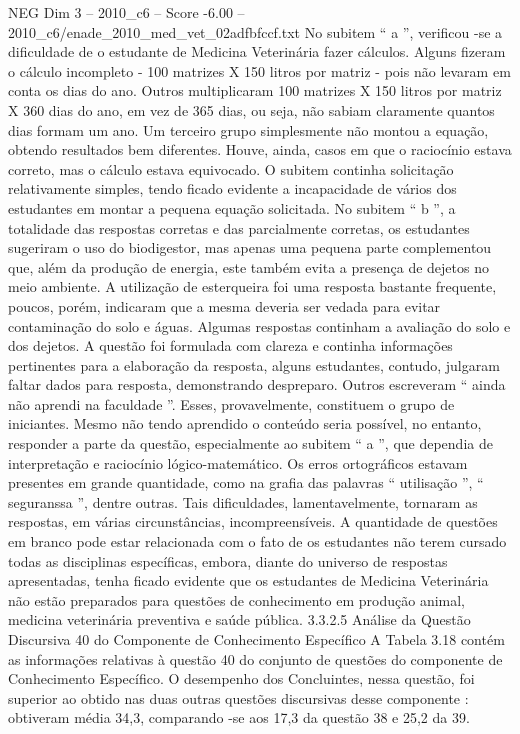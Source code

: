 \begin{textsample}{NEG Dim 3 – 2010\_c6 – Score -6.00 – 2010\_c6/enade\_2010\_med\_vet\_02adfbfccf.txt}
No subitem “ a ”, verificou -se a dificuldade de o estudante de Medicina Veterinária fazer cálculos.
Alguns fizeram o cálculo incompleto - 100 matrizes X 150 litros por matriz - pois não levaram em conta os dias do ano.
Outros multiplicaram 100 matrizes X 150 litros por matriz X 360 dias do ano, em vez de 365 dias, ou seja, não sabiam claramente quantos dias formam um ano.
Um terceiro grupo simplesmente não montou a equação, obtendo resultados bem diferentes.
Houve, ainda, casos em que o raciocínio estava correto, mas o cálculo estava equivocado.
O subitem continha solicitação relativamente simples, tendo ficado evidente a incapacidade de vários dos estudantes em montar a pequena equação solicitada.
No subitem “ b ”, a totalidade das respostas corretas e das parcialmente corretas, os estudantes sugeriram o uso do biodigestor, mas apenas uma pequena parte complementou que, além da produção de energia, este também evita a presença de dejetos no meio ambiente.
A utilização de esterqueira foi uma resposta bastante frequente, poucos, porém, indicaram que a mesma deveria ser vedada para evitar contaminação do solo e águas.
Algumas respostas continham a avaliação do solo e dos dejetos.
A questão foi formulada com clareza e continha informações pertinentes para a elaboração da resposta, alguns estudantes, contudo, julgaram faltar dados para resposta, demonstrando despreparo.
Outros escreveram “ ainda não aprendi na faculdade ”.
Esses, provavelmente, constituem o grupo de iniciantes.
Mesmo não tendo aprendido o conteúdo seria possível, no entanto, responder a parte da questão, especialmente ao subitem “ a ”, que dependia de interpretação e raciocínio lógico-matemático.
Os erros ortográficos estavam presentes em grande quantidade, como na grafia das palavras “ utilisação ”, “ seguranssa ”, dentre outras.
Tais dificuldades, lamentavelmente, tornaram as respostas, em várias circunstâncias, incompreensíveis.
A quantidade de questões em branco pode estar relacionada com o fato de os estudantes não terem cursado todas as disciplinas específicas, embora, diante do universo de respostas apresentadas, tenha ficado evidente que os estudantes de Medicina Veterinária não estão preparados para questões de conhecimento em produção animal, medicina veterinária preventiva e saúde pública. 3.3.2.5 Análise da Questão Discursiva 40 do Componente de Conhecimento Específico A Tabela 3.18 contém as informações relativas à questão 40 do conjunto de questões do componente de Conhecimento Específico.
O desempenho dos Concluintes, nessa questão, foi superior ao obtido nas duas outras questões discursivas desse componente : obtiveram média 34,3, comparando -se aos 17,3 da questão 38 e 25,2 da 39.

\end{textsample}
